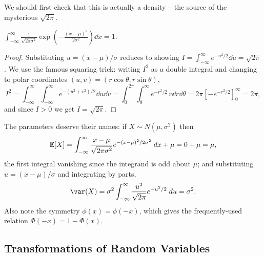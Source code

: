 \documentclass[a4paper]{scrartcl}
\begin{document}
\begin{center}
\end{center}

We should first check that this is actually a density -- the source of the mysterious $\sqrt{2\pi}$.

\begin{proposition}
	$\displaystyle\int_{-\infty}^{\infty} \frac{1}{\sqrt{2\pi\sigma^2}} \exp\left(-\frac{(x-\mu)^2}{2\sigma^2}\right)\dd x = 1$.
\end{proposition}
\begin{proof}
	Substituting $u = (x - \mu)/\sigma$ reduces to showing $I = \int_{-\infty}^{\infty} e^{-u^2/2}\dd u = \sqrt{2\pi}$. We use the famous squaring trick: writing $I^2$ as a double integral and changing to polar coordinates $(u, v) = (r\cos\theta, r\sin\theta)$,
	$$
	I^2 = \int_{-\infty}^{\infty}\!\int_{-\infty}^{\infty} e^{-(u^2 + v^2)/2}\dd u \dd v = \int_0^{2\pi}\!\!\int_0^{\infty} e^{-r^2/2}\, r\dd r\dd\theta = 2\pi \left[-e^{-r^2/2}\right]_0^{\infty} = 2\pi,
	$$
	and since $I > 0$ we get $I = \sqrt{2\pi}$.
\end{proof}

The parameters deserve their names: if $X \sim N(\mu, \sigma^2)$ then
$$
\mathbb{E}[X] = \int_{-\infty}^{\infty} \frac{x - \mu}{\sqrt{2\pi\sigma^2}}e^{-(x - \mu)^2/2\sigma^2}\; d x + \mu = 0 + \mu = \mu,
$$
the first integral vanishing since the integrand is odd about $\mu$; and substituting $u = (x - \mu)/\sigma$ and integrating by parts,
$$
\var(X) = \sigma^2 \int_{-\infty}^{\infty} \frac{u^2}{\sqrt{2\pi}}e^{-u^2/2}\dd u = \sigma^2.
$$
Also note the symmetry $\phi(x) = \phi(-x)$, which gives the frequently-used relation $\Phi(-x) = 1 - \Phi(x)$.

\subsection{Transformations of Random Variables}
\end{document}
